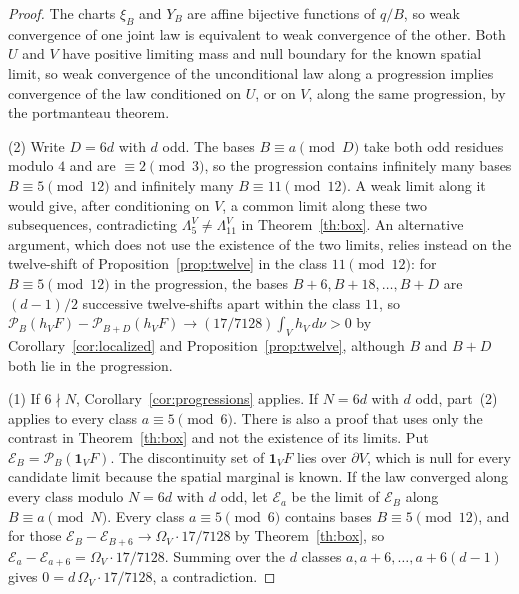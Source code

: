 \documentclass[11pt,reqno]{amsart}
\theoremstyle{remark}
\newcommand{\one}{\boldsymbol 1}
\begin{document}
\begin{proof}
The charts \(\xi_B\) and \(Y_B\) are affine bijective functions of \(q/B\), so weak convergence of one joint law is equivalent to weak convergence of the other. Both \(U\) and \(V\) have positive limiting mass and null boundary for the known spatial limit, so weak convergence of the unconditional law along a progression implies convergence of the law conditioned on \(U\), or on \(V\), along the same progression, by the portmanteau theorem.

(2) Write \(D=6d\) with \(d\) odd. The bases \(B\equiv a\pmod D\) take both odd residues modulo \(4\) and are \(\equiv2\pmod3\), so the progression contains infinitely many bases \(B\equiv5\pmod{12}\) and infinitely many \(B\equiv11\pmod{12}\). A weak limit along it would give, after conditioning on \(V\), a common limit along these two subsequences, contradicting \(\Lambda^V_5\ne\Lambda^V_{11}\) in Theorem~\ref{th:box}. An alternative argument, which does not use the existence of the two limits, relies instead on the twelve-shift of Proposition~\ref{prop:twelve} in the class \(11\pmod{12}\): for \(B\equiv5\pmod{12}\) in the progression, the bases \(B+6,B+18,\ldots,B+D\) are \((d-1)/2\) successive twelve-shifts apart within the class \(11\), so \(\mathcal P_B(h_VF)-\mathcal P_{B+D}(h_VF)\to(17/7128)\int_Vh_V\,d\nu>0\) by Corollary~\ref{cor:localized} and Proposition~\ref{prop:twelve}, although \(B\) and \(B+D\) both lie in the progression.

(1) If \(6\nmid N\), Corollary~\ref{cor:progressions} applies. If \(N=6d\) with \(d\) odd, part~(2) applies to every class \(a\equiv5\pmod6\). There is also a proof that uses only the contrast in Theorem~\ref{th:box} and not the existence of its limits. Put \(\mathcal E_B=\mathcal P_B(\one_VF)\). The discontinuity set of \(\one_VF\) lies over \(\partial V\), which is null for every candidate limit because the spatial marginal is known. If the law converged along every class modulo \(N=6d\) with \(d\) odd, let \(\mathcal E_a\) be the limit of \(\mathcal E_B\) along \(B\equiv a\pmod N\). Every class \(a\equiv5\pmod6\) contains bases \(B\equiv5\pmod{12}\), and for those \(\mathcal E_B-\mathcal E_{B+6}\to\Omega_V\cdot17/7128\) by Theorem~\ref{th:box}, so \(\mathcal E_a-\mathcal E_{a+6}=\Omega_V\cdot17/7128\). Summing over the \(d\) classes \(a,a+6,\ldots,a+6(d-1)\) gives \(0=d\,\Omega_V\cdot17/7128\), a contradiction.
\end{proof}
\end{document}
